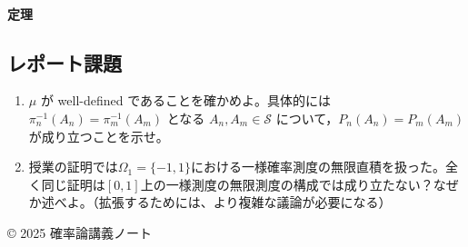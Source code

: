 \documentclass[uplatex,dvipdfmx,11pt,a4paper,openany]{bxjsbook}
\begin{document}
\paragraph{定理}
\subsection{レポート課題}
\begin{enumerate}
\item \(\mu\) が well-defined であることを確かめよ。具体的には \(\pi_n^{-1}(A_n)=\pi_m^{-1}(A_m)\) となる \(A_n,A_m\in \mathcal{S}\) について，\(P_n(A_n)=P_m(A_m)\) が成り立つことを示せ。
\item 授業の証明では\(\Omega_1 =  \{-1,1\}\)における一様確率測度の無限直積を扱った。全く同じ証明は$[0,1]$上の一様測度の無限測度の構成では成り立たない？なぜか述べよ。（拡張するためには、より複雑な議論が必要になる）
\end{enumerate}


© 2025 確率論講義ノート
\end{document}
